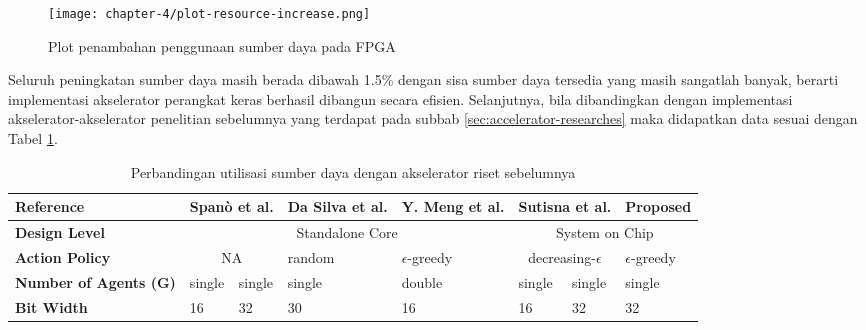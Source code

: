 \begin{figure}[h]
	\centering
	\texttt{[image: chapter-4/plot-resource-increase.png]}
	\caption{Plot penambahan penggunaan sumber daya pada \ac{FPGA}}
	\label{fig:plot-resource-increase}
\end{figure}

Seluruh peningkatan sumber daya masih berada dibawah 1.5\% dengan sisa sumber daya tersedia yang masih sangatlah banyak, berarti implementasi akselerator perangkat keras berhasil dibangun secara efisien. Selanjutnya, bila dibandingkan dengan implementasi akselerator-akselerator penelitian sebelumnya yang terdapat pada subbab \ref{sec:accelerator-researches} maka didapatkan data sesuai dengan Tabel \ref{tab:comparison-utilization}.


\begin{table}[h]
	\centering
	\caption{Perbandingan utilisasi sumber daya dengan akselerator riset sebelumnya}
	\label{tab:comparison-utilization}
	\renewcommand{\arraystretch}{1.2}
	\setlength{\tabcolsep}{3pt}
	\begin{tabularx}{\textwidth}{|p{20mm}|X|X|X|X|X|X|X|}
		\hline
		\textbf{Reference}            & \multicolumn{2}{c|}{Spanò et al. \parencite{spano2019efficient}} & Da Silva et al. \parencite{dasilva2019parallel} & Y. Meng et al. \parencite{meng2020generic} & \multicolumn{2}{c|}{Sutisna et al. \parencite{sutisna2023faraneq}} & Proposed                            \\ \hline
		\textbf{Design Level}         & \multicolumn{4}{c|}{Standalone Core}                             & \multicolumn{3}{c|}{System on Chip}                                                                                                                                                                     \\ \hline
		\textbf{Action Policy}        & \multicolumn{2}{c|}{NA}                                          & random                                          & $\epsilon$-greedy                          & \multicolumn{2}{c|}{decreasing-$\epsilon$}                         & $\epsilon$-greedy                   \\ \hline
		\textbf{Number of Agents (G)} & single                                                           & single                                          & single                                     & double                                                             & single            & single & single \\ \hline
		\textbf{Bit Width}            & 16                                                               & 32                                              & 30                                         & 16                                                                 & 16                & 32     & 32     \\ \hline

\end{tabularx}
\end{table}
